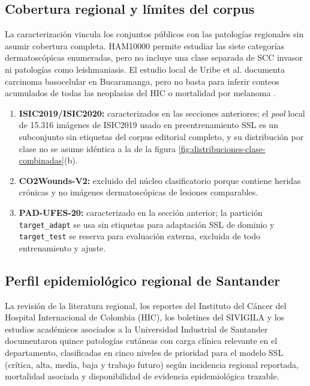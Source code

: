 \subsection{Cobertura regional y límites del corpus}

La caracterización vincula los conjuntos públicos con las patologías regionales sin asumir cobertura completa. HAM10000 permite estudiar las siete categorías dermatoscópicas enumeradas, pero no incluye una clase separada de SCC invasor ni patologías como leishmaniasis. El estudio local de Uribe et al. documenta carcinoma basocelular en Bucaramanga, pero no basta para inferir conteos acumulados de todas las neoplasias del HIC o mortalidad por melanoma \parencite{uribe2018bccbucaramanga}.

\begin{enumerate}[label=\alph*)]
    \item \textbf{ISIC2019/ISIC2020:} caracterizados en las secciones anteriores; el \textit{pool} local de 15.316 imágenes de ISIC2019 usado en preentrenamiento SSL es un subconjunto sin etiquetas del corpus editorial completo, y su distribución por clase no se asume idéntica a la de la figura \ref{fig:distribuciones-clase-combinadas}(b).
    \item \textbf{CO2Wounds-V2:} excluido del núcleo clasificatorio porque contiene heridas crónicas y no imágenes dermatoscópicas de lesiones comparables.
    \item \textbf{PAD-UFES-20:} caracterizado en la sección anterior; la partición \texttt{target\_adapt} se usa sin etiquetas para adaptación SSL de dominio y \texttt{target\_test} se reserva para evaluación externa, excluida de todo entrenamiento y ajuste.
\end{enumerate}

\subsection{Perfil epidemiológico regional de Santander}\label{sec:perfil-epidemiologico-santander}

La revisión de la literatura regional, los reportes del Instituto del Cáncer del Hospital Internacional de Colombia (HIC), los boletines del SIVIGILA y los estudios académicos asociados a la Universidad Industrial de Santander documentaron quince patologías cutáneas con carga clínica relevante en el departamento, clasificadas en cinco niveles de prioridad para el modelo SSL (crítica, alta, media, baja y trabajo futuro) según incidencia regional reportada, mortalidad asociada y disponibilidad de evidencia epidemiológica trazable.

